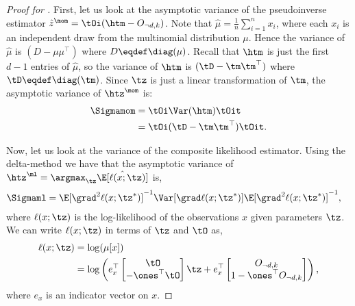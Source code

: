 \begin{proof}[Proof for ]
  First, let us look at the
  asymptotic variance of the pseudoinverse estimator
  $\hat{z}^\mom = \tOi (\htm - O_{\neg d,k})$. 
  Note that $\hat\mu = \frac1n\sum_{i=1}^n x_i$, where each $x_i$ is an independent draw from the multinomial distribution $\mu$.
  Hence the variance of
    $\hat\mu$ is $(D - \mu\mu^\top)$ where $D \eqdef \diag(\mu)$.
  Recall that $\htm$ is just the first $d-1$ entries of $\hat\mu$, so
  the variance of
    $\htm$ is $(\tD - \tm \tm^\top)$ where $\tD \eqdef \diag(\tm)$.
  Since $\tz$ is just a linear transformation of $\tm$,
  the asymptotic variance of $\htz^\mom$ is:
  \begin{align*}
      \Sigmamom &= \tOi \Var(\htm) \tOit \\
      &= \tOi (\tD - \tm \tm^\top) \tOit.
  \end{align*}
  
  Now, let us look at the variance of the composite likelihood estimator.  Using
  the delta-method \cite{vaart98asymptotic} we have that the asymptotic
  variance of 
  $\htz^\ml = \argmax_{\tz} \hat\E[\ell(x ; \tz)]$ is,
  \begin{align*}
    \Sigmaml &= \E[\grad^2 \ell(x ; \tz^*)]^{-1} \Var[\grad \ell(x ; \tz^*)] \E[\grad^2 \ell(x ; \tz^*)]^{-1},
  \end{align*}
  where $\ell(x;\tz)$ is the log-likelihood of the observations $x$
  given parameters $\tz$. We can write $\ell(x;\tz)$ in terms of $\tz$
  and $\tO$ as,
  \begin{align*}
    \ell(x;\tz) 
              &= \log( \mu[x] ) \\
              &= \log \left( 
    e_x^\top \begin{bmatrix}
      \tO \\
      - \ones^\top\tO
    \end{bmatrix} \tz 
    + 
    e_x^\top \begin{bmatrix}
      O_{\neg d, k} \\
      1 - \ones^\top O_{\neg d, k}
    \end{bmatrix}
    \right),
  \end{align*}
where $e_x$ is an indicator vector on $x$.


\end{proof}
